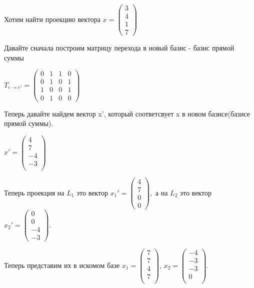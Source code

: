 \documentclass{article}
\begin{document}
Хотим найти проекцию вектора $x = \begin{pmatrix}
    3 \\
    4 \\
    1 \\
    7 
\end{pmatrix}$

Давайте сначала построим матрицу перехода в новый базис - базис прямой суммы 

$
T_{e \rightarrow e'}=
\begin{pmatrix}
    0 & 1 &1&0\\
    0 &1&0&1\\
    1 &0&0&1\\
    0 &1&0&0
\end{pmatrix}$

Теперь давайте  найдем вектор x', который соответсвует x в новом базисе(базисе прямой суммы).

$x' = \begin{pmatrix}
    4\\
    7\\
    -4\\
    -3\\
\end{pmatrix}$

Теперь проекция на $L_1$ это вектор $x_1'=\begin{pmatrix}
    4\\
    7\\
    0\\
    0
\end{pmatrix}, $ а на $L_2$ это вектор $x_2'=\begin{pmatrix}
    0\\
    0\\
    -4\\
    -3
\end{pmatrix}$.

Теперь представим их в искомом базе $x_1 = \begin{pmatrix}
    7\\
    7\\
    4\\
    7\\
\end{pmatrix}$, $x_2 = \begin{pmatrix}
    -4\\
    -3\\
    -3\\
    0\\
\end{pmatrix}$.
\end{document}
